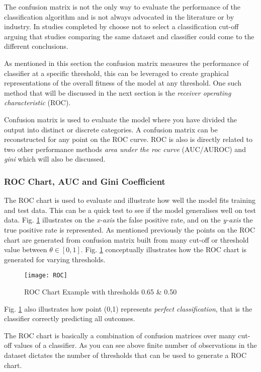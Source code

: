 The confusion matrix is not the only way to evaluate the performance of the classification algorithm and is not always advocated in the literature or by industry. In studies completed by \cite{lessmann_benchmarking_2008} choose not to select a classification cut-off arguing that studies comparing the same dataset and classifier could come to the different conclusions.

As mentioned in this section the confusion matrix measures the performance of classifier at a specific threshold, this can be leveraged to create graphical representations of the overall fitness of the model at any threshold. One such method that will be discussed in the next section is the \textit{receiver operating characteristic} (ROC). 


Confusion matrix is used to evaluate the model where you have divided the output into distinct or discrete categories. A confusion matrix can be reconstructed for any point on the ROC curve. ROC is also is directly related to two other performance methods \textit{area under the roc curve} (AUC/AUROC) and \textit{gini} which will also be discussed.  

\subsubsection{ROC Chart, AUC and Gini Coefficient}
The ROC chart is used to evaluate and illustrate how well the model fits training and test data. This can be a quick test to see if the model generalises well on test data. Fig. \ref{fig:ROC} illustrates on the \textit{x-axis} the false positive rate, and on the \textit{y-axis} the true positive rate is represented. As mentioned previously the points on the ROC chart are generated from confusion matrix built from many cut-off or threshold value between $\theta \in [0,1]$. Fig. \ref{fig:ROC} conceptually illustrates how the ROC chart is generated for varying thresholds. 

\begin{figure}[H]
	\texttt{[image: ROC]}
	\caption[ROC]
	{ROC Chart Example with thresholds 0.65 \& 0.50}
	\label{fig:ROC}
\end{figure}

Fig. \ref{fig:ROC} also illustrates how point (0,1) represents \textit{perfect classification}, that is the classifier correctly predicting all outcomes. 

The ROC chart is basically a combination of confusion matrices over many cut-off values of a classifier. As you can see above finite number of observations in the dataset dictates the number of thresholds that can be used to generate a ROC chart.

